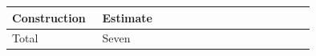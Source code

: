 \begin{tabular}{@{}p{0.28\linewidth}p{0.66\linewidth}@{}}\toprule Construction & Estimate \\ \midrule Total & Seven \\ \bottomrule \end{tabular}
